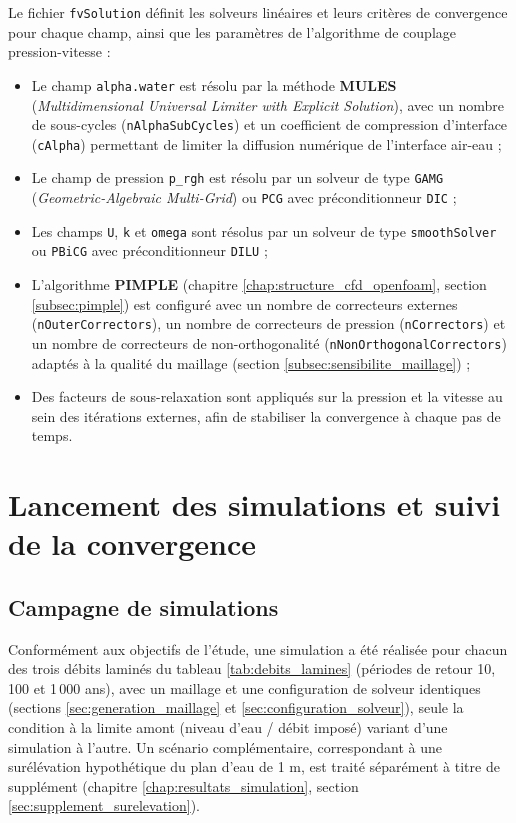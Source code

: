 Le fichier \texttt{fvSolution} définit les solveurs linéaires et leurs critères de convergence pour chaque champ, ainsi que les paramètres de l'algorithme de couplage pression-vitesse \cite{holzmann2017mathematics} :
\begin{itemize}
    \item Le champ \texttt{alpha.water} est résolu par la méthode \textbf{MULES} (\textit{Multidimensional Universal Limiter with Explicit Solution}), avec un nombre de sous-cycles (\texttt{nAlphaSubCycles}) et un coefficient de compression d'interface (\texttt{cAlpha}) permettant de limiter la diffusion numérique de l'interface air-eau ;
    \item Le champ de pression \texttt{p\_rgh} est résolu par un solveur de type \texttt{GAMG} (\textit{Geometric-Algebraic Multi-Grid}) ou \texttt{PCG} avec préconditionneur \texttt{DIC} ;
    \item Les champs \texttt{U}, \texttt{k} et \texttt{omega} sont résolus par un solveur de type \texttt{smoothSolver} ou \texttt{PBiCG} avec préconditionneur \texttt{DILU} ;
    \item L'algorithme \textbf{PIMPLE} (chapitre \ref{chap:structure_cfd_openfoam}, section \ref{subsec:pimple}) est configuré avec un nombre de correcteurs externes (\texttt{nOuterCorrectors}), un nombre de correcteurs de pression (\texttt{nCorrectors}) et un nombre de correcteurs de non-orthogonalité (\texttt{nNonOrthogonalCorrectors}) adaptés à la qualité du maillage (section \ref{subsec:sensibilite_maillage}) ;
    \item Des facteurs de sous-relaxation sont appliqués sur la pression et la vitesse au sein des itérations externes, afin de stabiliser la convergence à chaque pas de temps.
\end{itemize}


\section{Lancement des simulations et suivi de la convergence}
\label{sec:lancement_simulations}

\subsection{Campagne de simulations}
\label{subsec:campagne_simulations}

Conformément aux objectifs de l'étude, une simulation a été réalisée pour chacun des trois débits laminés du tableau \ref{tab:debits_lamines} (périodes de retour 10, 100 et 1\,000 ans), avec un maillage et une configuration de solveur identiques (sections \ref{sec:generation_maillage} et \ref{sec:configuration_solveur}), seule la condition à la limite amont (niveau d'eau / débit imposé) variant d'une simulation à l'autre. Un scénario complémentaire, correspondant à une surélévation hypothétique du plan d'eau de 1 m, est traité séparément à titre de supplément (chapitre \ref{chap:resultats_simulation}, section \ref{sec:supplement_surelevation}).

